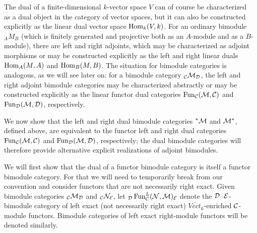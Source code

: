 \documentclass{amsart}
\begin{document}
The dual of a finite-dimensional $k$-vector space $V$ can of course be characterized as a dual object in the category of vector spaces, but it can also be constructed explicitly as the linear dual vector space $\operatorname{Hom}_k(V,k)$.  For an ordinary bimodule ${}_A M_B$ (which is finitely generated and projective both as an $A$-module and as a $B$-module), there are left and right adjoints, which may be characterized as adjoint morphisms or may be constructed explicitly as the left and right linear duals $\operatorname{Hom}_A(M,A)$ and $\operatorname{Hom}_B(M,B)$.  The situation for bimodule categories is analogous, as we will see later on: for a bimodule category ${}_\mathcal C \mathcal M_\mathcal D$, the left and right adjoint bimodule categories may be characterized abstractly or may be constructed explicitly as the linear functor dual categories $\operatorname{Fun}_\mathcal C(\mathcal M,\mathcal C)$ and $\operatorname{Fun}_\mathcal D(\mathcal M,\mathcal D)$, respectively.  

We now show that the left and right dual bimodule categories ${}^* \mathcal M$ and $\mathcal M^*$, defined above, are equivalent to the functor left and right dual categories $\operatorname{Fun}_\mathcal C(\mathcal M,\mathcal C)$ and $\operatorname{Fun}_\mathcal D(\mathcal M,\mathcal D)$, respectively; the dual bimodule categories will therefore provide alternative explicit realizations of adjoint bimodules.

We will first show that the dual of a functor bimodule category is itself a functor bimodule category.  For that we will need to temporarily break from our convention and consider functors that are not necessarily right exact.  Given bimodule categories ${}_\mathcal C \mathcal M_\mathcal D$ and ${}_{\mathcal C} \mathcal N_{\mathcal E}$, let ${}_{\mathcal D} \operatorname{Fun}^L_{\mathcal C}(\mathcal N,\mathcal M)_{\mathcal E}$ denote the $\mathcal D$--$\mathcal E$-bimodule category of left exact (not necessarily right exact) $\overline{Vect}_k$-enriched $\mathcal C$-module functors.  Bimodule categories of left exact right-module functors will be denoted similarly.
\end{document}
